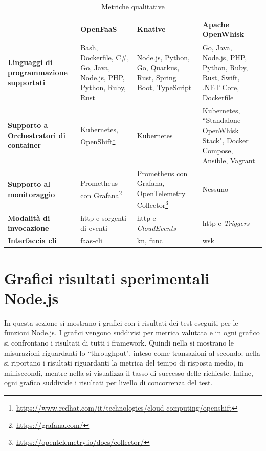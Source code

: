 \documentclass[12pt,a4paper,openany,twoside]{book}
\begin{document}
\begin{table}[h!]
    \centering
    \begin{tabularx}{\textwidth} { 
  | >{\centering\arraybackslash}X 
  | >{\centering\arraybackslash}X
  | >{\centering\arraybackslash}X
  | >{\centering\arraybackslash}X | }
        \hline
        \rowcolor{yellow}
          &  \textbf{OpenFaaS} & \textbf{Knative} & \textbf{Apache OpenWhisk} \\ [0.8ex]
        \hline
        \textbf{Linguaggi di programmazione supportati} & Bash, Dockerfile, C\#, Go, Java, Node.js, PHP, Python, Ruby, Rust & Node.js, Python, Go, Quarkus, Rust, Spring Boot, TypeScript & Go, Java, Node.js, PHP, Python, Ruby, Rust, Swift, .NET Core, Dockerfile \\
        \hline
        \textbf{Supporto a Orchestratori di container} & Kubernetes, OpenShift\footnote{\url{https://www.redhat.com/it/technologies/cloud-computing/openshift}} & Kubernetes & Kubernetes, ``Standalone OpenWhisk Stack", Docker Compose, Ansible, Vagrant \\
        \hline
        \textbf{Supporto al monitoraggio} & Prometheus con Grafana\footnote{\url{https://grafana.com/}} & Prometheus con Grafana, OpenTelemetry Collector\footnote{\url{https://opentelemetry.io/docs/collector/}} & Nessuno \\
        \hline
        \textbf{Modalità di invocazione} & \ac{http} e sorgenti di eventi & \ac{http} e \textit{CloudEvents} & \ac{http} e \textit{Triggers} \\
        \hline
        \textbf{Interfaccia \ac{cli}} & faas-cli & kn, func & wsk \\
        \hline
    \end{tabularx}
    \caption{Metriche qualitative}
    \label{tab:tabella-metriche-qualitative}
\end{table}

\section{Grafici risultati sperimentali Node.js}

In questa sezione si mostrano i grafici con i risultati dei test eseguiti per le funzioni Node.js. I grafici vengono suddivisi per metrica valutata e in ogni grafico si confrontano i risultati di tutti i framework. Quindi nella  si mostrano le misurazioni riguardanti lo ``throughput", inteso come transazioni al secondo; nella  si riportano i risultati riguardanti la metrica del tempo di risposta medio, in millisecondi, mentre nella  si visualizza il tasso di successo delle richieste. Infine, ogni grafico suddivide i risultati per livello di concorrenza del test.
\end{document}
